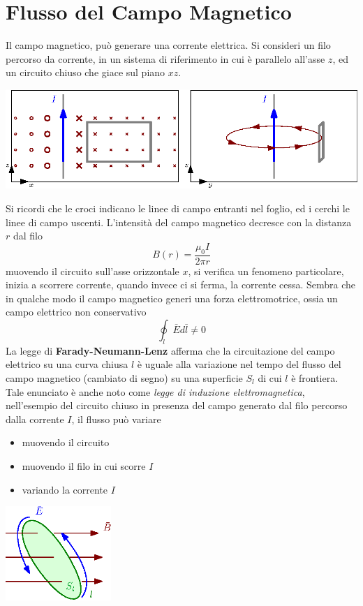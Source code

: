 \documentclass[10pt, letterpaper]{report}
\begin{document}
 \section{Flusso del Campo Magnetico}
 Il campo magnetico, può generare una corrente elettrica. Si consideri un filo percorso da corrente, in un sistema di riferimento in cui è parallelo all'asse $z$, ed un circuito chiuso che giace sul piano $xz$.
 \begin{center}
    \includegraphics[width=\textwidth ]{images/Faraday.eps}
\end{center}
Si ricordi che le croci indicano le linee di campo entranti nel foglio, ed i cerchi le linee di campo uscenti. L'intensità del campo magnetico decresce con la distanza $r$ dal filo 
$$ B(r)=\frac{\mu_0I}{2\pi r}$$
muovendo il circuito sull'asse orizzontale $x$, si verifica un fenomeno particolare, inizia a scorrere corrente, quando invece ci si ferma, la corrente cessa. \acc 
Sembra che in qualche modo il campo magnetico generi una forza elettromotrice, ossia un campo elettrico non conservativo $$ \oint_l \bar E d\bar l \ne 0$$
\teo{} La legge di \textbf{Farady-Neumann-Lenz} afferma che la circuitazione del campo elettrico su una curva chiusa $l$ è uguale alla variazione nel tempo del flusso del campo magnetico (cambiato di segno) su una superficie $S_l$ di cui $l$ è frontiera.
Tale enunciato è anche noto come \textit{legge di induzione elettromagnetica},  nell'esempio del circuito chiuso in presenza del campo generato dal filo percorso dalla corrente $I$, il flusso può variare\begin{itemize}
    \item muovendo il circuito 
    \item muovendo il filo in cui scorre $I$
    \item variando la corrente $I$
\end{itemize}
\begin{center}
    \includegraphics[width=0.3\textwidth ]{images/Faraday2.eps}
\end{center}
\end{document}
